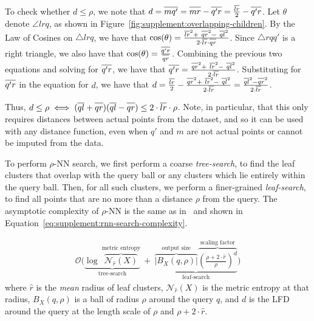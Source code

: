 \documentclass[review,supplement,onefignum,onetabnum]{siamonline220329}
\begin{document}
To check whether $d \leq \rho$, we note that $d = \overline{m q' \vphantom{l}} = \overline{m r \vphantom{l}} - \overline{q' r \vphantom{l}} = \frac{\overline{l r}}{2} - \overline{q' r \vphantom{l}}$.
Let $\theta$ denote $\angle l r q$, as shown in Figure~\ref{fig:supplement:overlapping-children}.
By the Law of Cosines on $\triangle l r q$, we have that $\text{cos}(\theta) = \tfrac{\overline{l r}^2 + \ \overline{q r \vphantom{l}}^2 - \ \overline{q l}^2}{2 \cdot \overline{l r} \cdot \overline{q r \vphantom{l}}}$.
Since $\triangle r q q'$ is a right triangle, we also have that $\text{cos}(\theta) = \tfrac{\overline{q' r \vphantom{l}}}{\overline{q r \vphantom{l}}}$.
Combining the previous two equations and solving for $\overline{q' r \vphantom{l}}$, we have that $\overline{q' r \vphantom{l}} = \tfrac{\overline{q r \vphantom{l}}^2 + \ \overline{l r}^2 - \ \overline{q l}^2}{2 \cdot \overline{l r}}$.
Substituting for $\overline{q' r \vphantom{l}}$ in the equation for $d$, we have that $d = \tfrac{\overline{l r}}{2} - \tfrac{\overline{q r \vphantom{l}}^2 + \ \overline{l r}^2 - \ \overline{q l}^2}{2 \cdot \overline{l r}} = \tfrac{\overline{q l}^2 - \overline{q r \vphantom{l}}^2}{2 \cdot \overline{l r}}$.


Thus, $d \leq \rho \iff (\overline{q l} + \overline{q r \vphantom{l}})(\overline{q l} - \overline{q r \vphantom{l}}) \leq 2 \cdot \overline{l r} \cdot \rho$. Note, in particular, that this only requires distances between actual points from the dataset, and so it can be used with any distance function, even when $q'$ and $m$ are not actual points or cannot be imputed from the data.

To perform $\rho$-NN search, we first perform a coarse \textit{tree-search}, to find the leaf clusters that overlap with the query ball or any clusters which lie entirely within the query ball.
Then, for all such clusters, we perform a finer-grained \textit{leaf-search}, to find all points that are no more than a distance $\rho$ from the query.
The asymptotic complexity of $\rho$-NN is the same as in~\cite{ishaq2019clustered} and shown in Equation~\ref{eq:supplement:rnn-search-complexity}.

\begin{gather}
    \mathcal{O}
    \Bigg(
        \underbrace{
            \log~\overbrace{\mathcal{N}_{\hat{r}}(X)}^{\textrm{metric entropy}}
        }_{\textrm{tree-search}}
        \ + \
        \underbrace{
            \overbrace{ \big| B_X(q, \rho) \big|}^{\textrm{output size}}
            \overbrace{ \left( \frac{\rho + 2 \cdot \hat{r}}{ \rho} \right) ^ d}^{\textrm{scaling factor}}
        }_{\textrm{leaf-search}}
    \Bigg)
    \label{eq:supplement:rnn-search-complexity}
\end{gather}
where $\hat{r}$ is the \textit{mean} radius of leaf clusters, $\mathcal{N}_{\hat{r}}(X)$ is the metric entropy at that radius, $B_X(q, \rho)$ is a ball of radius $\rho$ around the query $q$, and $d$ is the LFD around the query at the length scale of $\rho$ and $\rho + 2 \cdot \hat{r}$.
\end{document}
